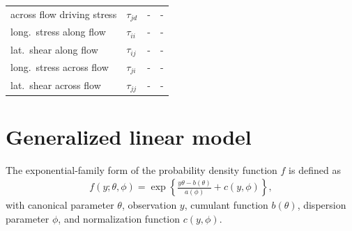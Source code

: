 \begin{table}[t]
\begin{tabular}{l|l|l|l}
  across flow driving stress         & $\tau_{jd}$                                        & -                 & -                             \\
  long.\ stress along flow           & $\tau_{ii}$                                        & -                 & -                             \\
  lat.\ shear along flow             & $\tau_{ij}$                                        & -                 & -                             \\
  long.\ stress across flow          & $\tau_{ji}$                                        & -                 & -                             \\
  lat.\ shear across flow            & $\tau_{jj}$                                        & -                 & -                             \\
\end{tabular}
\end{table}

\section{Generalized linear model}

The exponential-family form of the probability density function $f$ is defined as \citep{mccullagh_1989}
\begin{align*}
  f(y; \theta, \phi) = \exp\left\{ \frac{y\theta - b(\theta)}{a(\phi)} + c(y,\phi) \right\},
\end{align*}
with canonical parameter $\theta$, observation $y$, cumulant function $b(\theta)$, dispersion parameter $\phi$, and normalization function $c(y,\phi)$.

